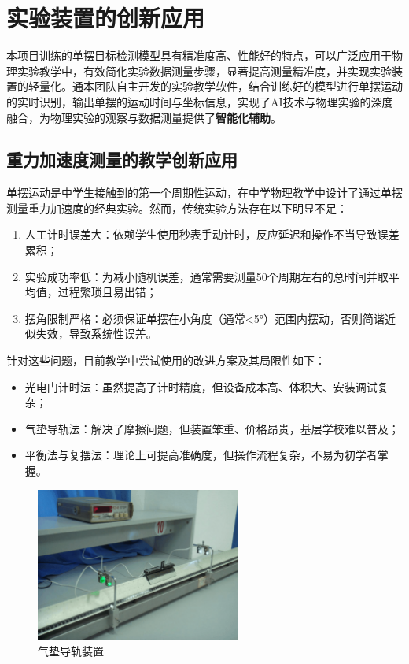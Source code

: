 \section{实验装置的创新应用}


本项目训练的单摆目标检测模型具有精准度高、性能好的特点，可以广泛应用于物理实验教学中，有效简化实验数据测量步骤，显著提高测量精准度，并实现实验装置的轻量化。通本团队自主开发的实验教学软件，结合训练好的模型进行单摆运动的实时识别，输出单摆的运动时间与坐标信息，实现了AI技术与物理实验的深度融合，为物理实验的观察与数据测量提供了\textbf{智能化辅助}。

\subsection{重力加速度测量的教学创新应用}

单摆运动是中学生接触到的第一个周期性运动，在中学物理教学中设计了通过单摆测量重力加速度的经典实验。然而，传统实验方法存在以下明显不足：

\begin{enumerate}[leftmargin=*]
    \item 人工计时误差大：依赖学生使用秒表手动计时，反应延迟和操作不当导致误差累积；
    
    \item 实验成功率低：为减小随机误差，通常需要测量50个周期左右的总时间并取平均值，过程繁琐且易出错；
    
    \item 摆角限制严格：必须保证单摆在小角度（通常<5°）范围内摆动，否则简谐近似失效，导致系统性误差。
\end{enumerate}

针对这些问题，目前教学中尝试使用的改进方案及其局限性如下：

\begin{itemize}
    \item 光电门计时法：虽然提高了计时精度，但设备成本高、体积大、安装调试复杂；
    
    \item 气垫导轨法：解决了摩擦问题，但装置笨重、价格昂贵，基层学校难以普及；
    
    \item 平衡法与复摆法：理论上可提高准确度，但操作流程复杂，不易为初学者掌握。
\end{itemize}

\begin{figure}[H]
    \centering
    \includegraphics[width=0.6\textwidth]{figures/气垫导轨.png}
    \caption{气垫导轨装置}
    \label{fig:air_track}
\end{figure}

